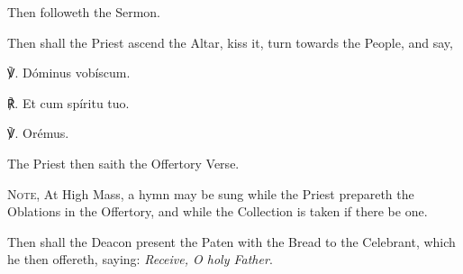 \begin{rubric}
	Then followeth the Sermon.
\end{rubric}

\begin{rubric}
    Then shall the Priest ascend the Altar, kiss it, turn towards the People, and say,
\end{rubric}

℣. Dóminus vobíscum.

℟. Et cum spíritu tuo.

℣. Orémus.
\begin{multicols}{2}    
\begin{rubric}
    The Priest then saith the Offertory Verse.\par
    \textsc{Note,} At High Mass, a hymn may be sung while the Priest prepareth the Oblations in the Offertory, and while the Collection is taken if there be one.
\end{rubric}
\begin{rubric}
    Then shall the Deacon present the Paten with the Bread to the Celebrant, which he then offereth, saying: \emph{Receive, O holy Father}.
\end{rubric}


\end{multicols}
